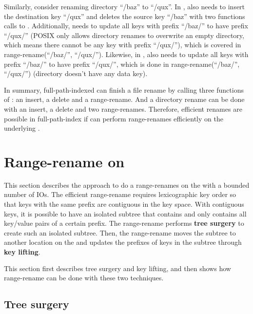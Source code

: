 Similarly, consider renaming directory ``/baz'' to ``/qux''.
In \mdb, \betrfs also needs to insert the destination key ``/qux'' and deletes
the source key ``/baz'' with two functions calls to \fti.
Additionally, \betrfs needs to update all keys with prefix ``/baz/'' to have
prefix ``/qux/''
(POSIX only allows directory renames to overwrite an empty directory, which
means there cannot be any key with prefix ``/qux/''),
which is covered in range-rename(``/baz/'', ``/qux/'').
Likewise, in \ddb, \betrfs also needs to update all keys with prefix ``/baz/''
to have prefix ``/qux/'', which is done in range-rename(``/baz/'', ``/qux/'')
(directory doesn't have any data key).

In summary, full-path-indexed \betrfs can finish a file rename by calling three
functions of \fti: an insert, a delete and a range-rename.
And a directory rename can be done with an insert, a delete and two
range-renames.
Therefore, efficient renames are possible in full-path-index \betrfs if
\fti can perform range-renames efficiently on the underlying \bets.

\section{Range-rename on \bets}

This section describes the approach to do a range-renames on the \bet
with a bounded number of IOs.
The efficient range-rename requires lexicographic key order so that keys with
the same prefix are contiguous in the key space.
With contiguous keys, it is possible to have an isolated subtree that contains
and only contains all key/value pairs of a certain prefix.
The range-rename performs \textbf{tree surgery} to create such an isolated
subtree.
Then, the range-rename moves the subtree to another location on the \bet and
updates the prefixes of keys in the subtree through \textbf{key lifting}.

This section first describes tree surgery and key lifting, and then shows how
range-rename can be done with these two techniques.

\subsection{Tree surgery}

